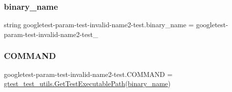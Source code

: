 \subsubsection{\texorpdfstring{binary\_name}{binary\_name}}
{\footnotesize\ttfamily string googletest-\/param-\/test-\/invalid-\/name2-\/test.\+binary\+\_\+name = \textquotesingle{}googletest-\/param-\/test-\/invalid-\/name2-\/test\+\_\+\textquotesingle{}}

\mbox{\label{namespacegoogletest-param-test-invalid-name2-test_ac9395338e8bff8c30835e578658394e3}} 
\subsubsection{\texorpdfstring{COMMAND}{COMMAND}}
{\footnotesize\ttfamily googletest-\/param-\/test-\/invalid-\/name2-\/test.\+C\+O\+M\+M\+A\+ND = \mbox{\hyperlink{namespacegtest__test__utils_a89ed3717984a80ffbb7a9c92f71b86a2}{gtest\+\_\+test\+\_\+utils.\+Get\+Test\+Executable\+Path}}(\mbox{\hyperlink{namespacegoogletest-param-test-invalid-name2-test_a0e26891aaf72a6f04a60811b05a83e81}{binary\+\_\+name}})}

